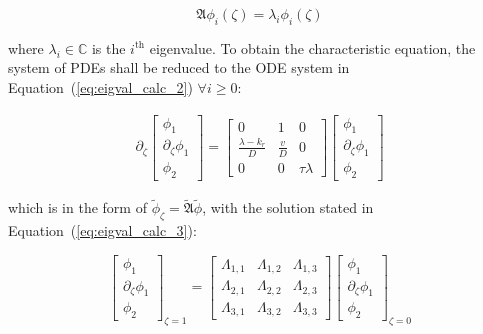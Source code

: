 \begin{equation} \label{eq:eig_prob}
        \mathfrak{A} {\phi_i}(\zeta) = \lambda_i {\phi_i}(\zeta)
\end{equation}


where $\lambda_i \in \mathbb{C}$ is the $i^{\text{th}}$ eigenvalue. To obtain the characteristic equation, the system of PDEs shall be reduced to the ODE system in Equation~(\ref{eq:eigval_calc_2}) $\forall i \geq 0$:

\begin{equation} \label{eq:eigval_calc_2}
    \begin{aligned}
        \partial_\zeta \begin{bmatrix}
            \phi_1 \\ \partial_\zeta \phi_1 \\ \phi_2
        \end{bmatrix} = \begin{bmatrix}
            0 & 1 & 0 \\
            \frac{\lambda-k_r}{D} & \frac{v}{D} & 0 \\
            0 & 0 & \tau \lambda 
        \end{bmatrix} \begin{bmatrix}
            \phi_1 \\ \partial_\zeta \phi_1 \\ \phi_2
        \end{bmatrix}
    \end{aligned}
\end{equation}

which is in the form of $ \tilde{{\phi}}_\zeta  = \tilde{\mathfrak{A}} \tilde{{\phi}}$, with the solution stated in Equation~(\ref{eq:eigval_calc_3}):

\begin{equation} \label{eq:eigval_calc_3}
    \begin{bmatrix}
        \phi_1 \\ \partial_\zeta \phi_1 \\ \phi_2
    \end{bmatrix}_{\zeta=1} = \begin{bmatrix}
        \Lambda_{1,1} & \Lambda_{1,2} & \Lambda_{1,3} \\
        \Lambda_{2,1} & \Lambda_{2,2} & \Lambda_{2,3} \\
        \Lambda_{3,1} & \Lambda_{3,2} & \Lambda_{3,3}
    \end{bmatrix} \begin{bmatrix}
        \phi_1 \\ \partial_\zeta \phi_1 \\ \phi_2
    \end{bmatrix}_{\zeta=0}
\end{equation}

